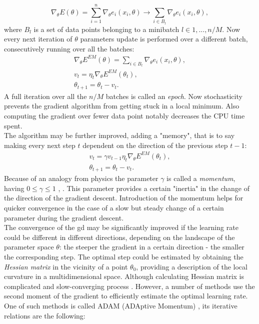 \begin{equation}
\nabla_{\theta}E(\theta) = \sum^n_{i=1} \nabla_{\theta}e_i(x_i,\theta) \rightarrow \sum_{i \in B_l} \nabla_{\theta}e_i(x_i,\theta),
\end{equation}
where $B_l$ is a set of data points belonging to a minibatch $l \in 1, ... , n/M$. Now every next iteration of $\theta$ parameters update is performed over a different batch, consecutively running over all the batches: 
\begin{equation}
\begin{array}{lcl} 
\nabla_{\theta}E^{EM}(\theta) = \sum_{i \in B_l} \nabla_{\theta}e_i(x_i,\theta),\\
v_t=\eta_t\nabla_{\theta}E^{EM}(\theta_t),\\
\theta_{t+1}=\theta_t-v_t.
\end{array} 
\end{equation}
A full iteration over all the $n/M$ batches is called an \textit{epoch}. Now stochasticity prevents the gradient algorithm from getting stuck in a local minimum. Also computing the gradient over fewer data point notably decreases the CPU time spent. \\
The algorithm may be further improved, adding a "memory", that is to say making every next step $t$ dependent on the direction of the previous step $t-1$:
\begin{equation}
\begin{array}{lcl} 
v_t=\gamma v_{t-1}\eta_t\nabla_{\theta}E^{EM}(\theta_t),\\
\theta_{t+1}=\theta_t-v_t.
\end{array} 
\end{equation}
Because of an analogy from physics the parameter $\gamma$ is called a \textit{momentum}, having $0\le\gamma \le 1$ \cite{grad_momentum1}, \cite{grad_momentum2}. This parameter provides a certain "inertia" in the change of the direction of the gradient descent. Introduction of the momentum helps for quicker convergence in the case of a slow but steady change of a certain parameter during the gradient descent.\\
The convergence of the \gls{gd} may be significantly improved if the learning rate could be different in different directions, depending on the landscape of the parameter space $\theta$: the steeper the gradient in a certain direction - the smaller the corresponding step. The optimal step could be estimated by obtaining the \textit{Hessian matrix} in the vicinity of a point $\theta_0$, providing a description of the local curvature in a multidimensional space. Although calculating Hessian matrix is complicated and slow-converging process \cite{LeCun1998}. However, a number of methods use the second moment of the gradient to efficiently estimate the optimal learning rate. One of such methods is called ADAM (ADAptive Momentum) \cite{kingma2014method}, its iterative relations are the following:
